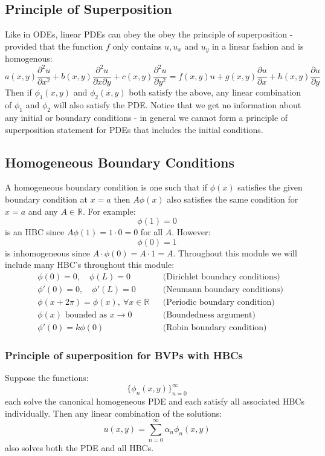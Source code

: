\documentclass[12pt]{article}
\newcommand{\pf}[2]{\frac{\partial #1}{\partial #2}}
\begin{document}
\subsection{Principle of Superposition}
Like in ODEs, linear PDEs can obey the obey the principle of superposition - provided that the function \(f\) only contains \(u,u_x\) and \(u_y\) in a linear fashion and is homogenous:
\[a(x,y)\pf{^2u}{x^2}+b(x,y)\pf{^2u}{x\partial y}+c(x,y)\pf{^2u}{y^2}=f(x,y)u+g(x,y)\pf{u}{x}+h(x,y)\pf{u}{y}\]
Then if \(\phi_1(x,y)\) and \(\phi_2(x,y)\) both satisfy the above, any linear combination of \(\phi_1\) and \(\phi_2\) will also satisfy the PDE. Notice that we get no information about any initial or boundary conditions - in general we cannot form a principle of superposition statement for PDEs that includes the initial conditions.
\subsection{Homogeneous Boundary Conditions}
A homogeneous boundary condition is one such that if \(\phi(x)\) satisfies the given boundary condition at \(x=a\) then \(A\phi(x)\) also satisfies the same condition for \(x=a\) and any \(A\in\mathbb{R}\). For example:
\[\phi(1)=0\]
is an HBC since \(A\phi(1)=1\cdot 0=0\) for all \(A\). However:
\[\phi(0)=1\]
is inhomogeneous since \(A\cdot\phi(0)=A\cdot 1=A\). Throughout this module we will include many HBC's throughout this module:
\begin{align*}
    &\phi(0)=0,\quad \phi(L)=0 && \text{(Dirichlet boundary conditions)} \\
    &\phi'(0)=0,\quad \phi'(L)=0 && \text{(Neumann boundary conditions)} \\
    &\phi(x+2\pi)=\phi(x),\  \forall x\in \mathbb{R} && \text{(Periodic boundary condition)} \\
    &\phi(x) \text{ bounded as } x\to 0 && \text{(Boundedness argument)} \\
    &\phi'(0)=k\phi(0) && \text{(Robin boundary condition)}
\end{align*}
\subsubsection{Principle of superposition for BVPs with HBCs}
Suppose the functions:
\[\{\phi_n(x,y)\}^\infty_{n=0}\]
each solve the canonical homogeneous PDE and each satisfy all associated HBCs individually. Then any linear combination of the solutions:
\[u(x,y)=\sum^\infty_{n=0}\alpha_n\phi_n(x,y)\]
also solves both the PDE and all HBCs.
\end{document}

